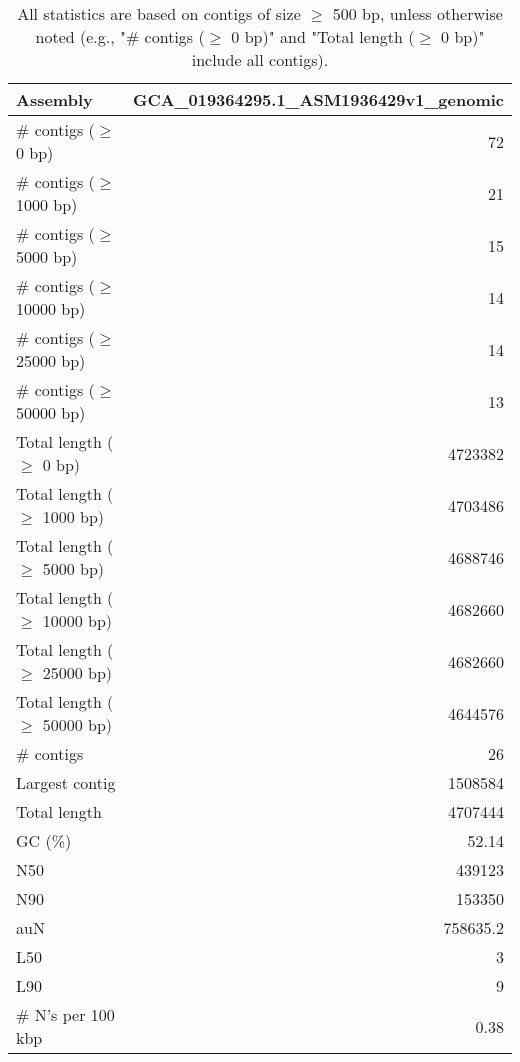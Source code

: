 \documentclass[12pt,a4paper]{article}
\begin{document}
\begin{table}[ht]
\begin{center}
\caption{All statistics are based on contigs of size $\geq$ 500 bp, unless otherwise noted (e.g., "\# contigs ($\geq$ 0 bp)" and "Total length ($\geq$ 0 bp)" include all contigs).}
\begin{tabular}{|l*{1}{|r}|}
\hline
Assembly & GCA\_019364295.1\_ASM1936429v1\_genomic \\ \hline
\# contigs ($\geq$ 0 bp) & 72 \\ \hline
\# contigs ($\geq$ 1000 bp) & 21 \\ \hline
\# contigs ($\geq$ 5000 bp) & 15 \\ \hline
\# contigs ($\geq$ 10000 bp) & 14 \\ \hline
\# contigs ($\geq$ 25000 bp) & 14 \\ \hline
\# contigs ($\geq$ 50000 bp) & 13 \\ \hline
Total length ($\geq$ 0 bp) & 4723382 \\ \hline
Total length ($\geq$ 1000 bp) & 4703486 \\ \hline
Total length ($\geq$ 5000 bp) & 4688746 \\ \hline
Total length ($\geq$ 10000 bp) & 4682660 \\ \hline
Total length ($\geq$ 25000 bp) & 4682660 \\ \hline
Total length ($\geq$ 50000 bp) & 4644576 \\ \hline
\# contigs & 26 \\ \hline
Largest contig & 1508584 \\ \hline
Total length & 4707444 \\ \hline
GC (\%) & 52.14 \\ \hline
N50 & 439123 \\ \hline
N90 & 153350 \\ \hline
auN & 758635.2 \\ \hline
L50 & 3 \\ \hline
L90 & 9 \\ \hline
\# N's per 100 kbp & 0.38 \\ \hline
\end{tabular}
\end{center}
\end{table}
\end{document}
